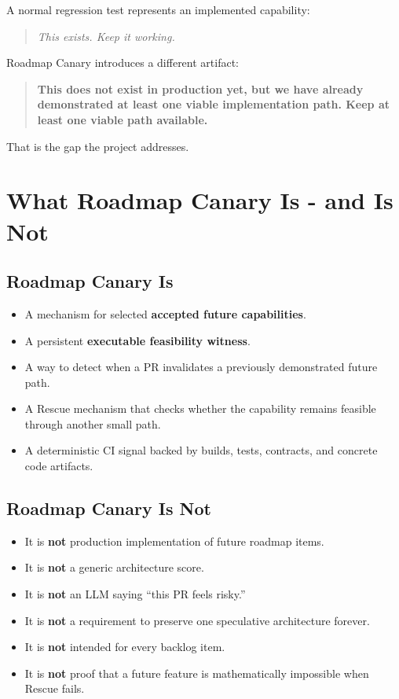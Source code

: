 \documentclass[12pt]{article}
\begin{document}
A normal regression test represents an implemented capability:

\begin{quote}
\textit{This exists. Keep it working.}
\end{quote}

Roadmap Canary introduces a different artifact:

\begin{quote}
\textbf{This does not exist in production yet, but we have already demonstrated at least one viable implementation path. Keep at least one viable path available.}
\end{quote}

That is the gap the project addresses.

\section{What Roadmap Canary Is - and Is Not}

\subsection{Roadmap Canary Is}

\begin{itemize}
    \item A mechanism for selected \textbf{accepted future capabilities}.
    \item A persistent \textbf{executable feasibility witness}.
    \item A way to detect when a PR invalidates a previously demonstrated future path.
    \item A Rescue mechanism that checks whether the capability remains feasible through another small path.
    \item A deterministic CI signal backed by builds, tests, contracts, and concrete code artifacts.
\end{itemize}

\subsection{Roadmap Canary Is Not}

\begin{itemize}
    \item It is \textbf{not} production implementation of future roadmap items.
    \item It is \textbf{not} a generic architecture score.
    \item It is \textbf{not} an LLM saying ``this PR feels risky.''
    \item It is \textbf{not} a requirement to preserve one speculative architecture forever.
    \item It is \textbf{not} intended for every backlog item.
    \item It is \textbf{not} proof that a future feature is mathematically impossible when Rescue fails.
\end{itemize}
\end{document}
